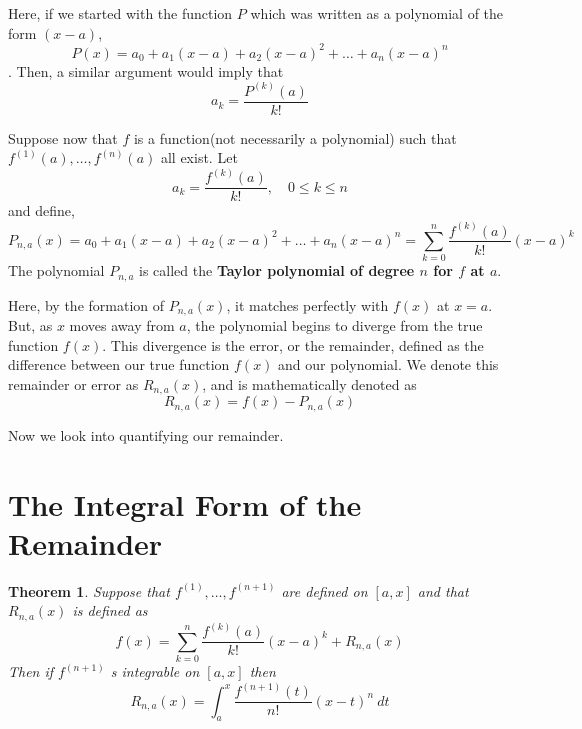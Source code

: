 \documentclass[12pt, a4paper]{article}
\newtheorem{theorem}{Theorem}[section]
\theoremstyle{definition}
\theoremstyle{remark}
\begin{document}
Here, if we started with the function $P$ which was written as a polynomial of the form $(x-a)$,
\[P(x) = a_0 + a_1(x-a) + a_2(x-a)^2 + \ldots + a_n(x-a)^n\]. Then, a similar argument would imply that \[a_k = \frac{P^{(k)}(a)}{k!}\]

Suppose now that $f$ is a function(not necessarily a polynomial) such that $f^{(1)}(a), \ldots, f^{(n)}(a)$ all exist. Let \[a_k = \frac{f^{(k)}(a)}{k!}, \quad 0 \le k \le n\] and define,
\[
P_{n,a}(x) = a_0 + a_1(x-a) + a_2(x-a)^2 + \ldots + a_n(x-a)^n = \sum_{k = 0}^{n} \frac{f^{(k)}(a)}{k!}(x-a)^k
\]
The polynomial $P_{n,a}$ is called the \textbf{Taylor polynomial of degree $n$ for $f$ at $a$}.

Here, by the formation of $P_{n,a}(x)$, it matches perfectly with $f(x)$ at $x = a$. But, as $x$ moves away from $a$, the polynomial begins to diverge from the true function $f(x)$. This divergence is the error, or the remainder, defined as the difference between our true function $f(x)$ and our polynomial. We denote this remainder or error as $R_{n,a}(x)$, and is mathematically denoted as \[R_{n,a}(x) = f(x) - P_{n,a}(x)\]

Now we look into quantifying our remainder.

\section{The Integral Form of the Remainder}
\begin{theorem}
    Suppose that $f^{(1)}, \ldots, f^{(n+1)}$ are defined on $[a,x]$ and that $R_{n,a}(x)$ is defined as
    \[
    f(x) = \sum_{k = 0}^{n} \frac{f^{(k)}(a)}{k!}(x-a)^k + R_{n,a}(x)
    \]
    Then if $f^{(n+1)}$ s integrable on $[a,x]$ then
    \[
    R_{n,a}(x) = \int_{a}^{x} \frac{f^{(n+1)}(t)}{n!}(x-t)^n \ dt
    \]
\end{theorem}
\end{document}

